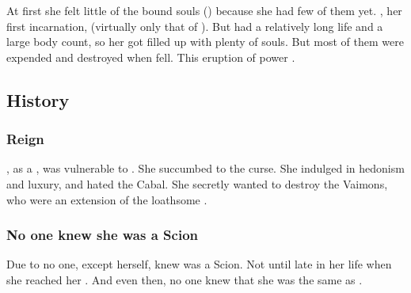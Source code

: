 At first she felt little of the bound souls () because she had few of them yet. 
\Delphine{}, her first incarnation,  (virtually only that of \Eryal). 
But \Belzir{} had a relatively long life and a large body count, so her \carcer{} got filled up with plenty of souls. 
But most of them were expended and destroyed when \Belzir{} fell. 
This eruption of power . 









\subsection{History}





\subsubsection{Reign}
\Belzir, as a \sathariah, was vulnerable to . 
She succumbed to the curse. 
She indulged in hedonism and luxury, and hated the Cabal. 
She secretly wanted to destroy the Vaimons, who were an extension of the loathsome \banes. 





\subsubsection{No one knew she was a Scion}
Due to  no one, except \Belzir{} herself, knew \Belzir{} was a Scion. 
Not until late in her life when she reached her \Apotheosis. 
And even then, no one knew that she was the same as \Delphine. 

